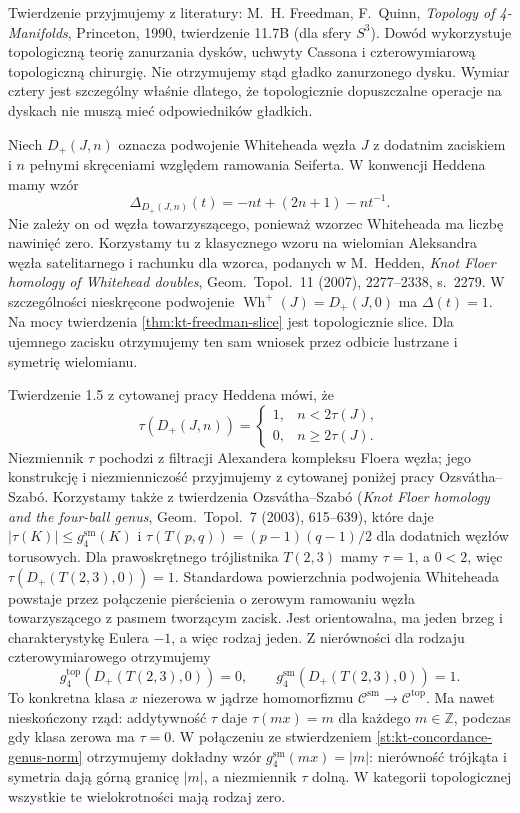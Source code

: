 \begin{uwaga}
Twierdzenie przyjmujemy z literatury:
M.~H. Freedman, F.~Quinn,
\emph{Topology of 4-Manifolds}, Princeton, 1990,
twierdzenie 11.7B (dla sfery $S^3$).
Dowód wykorzystuje topologiczną teorię zanurzania dysków,
uchwyty Cassona i czterowymiarową topologiczną chirurgię.
Nie otrzymujemy stąd gładko zanurzonego dysku. Wymiar
cztery jest szczególny właśnie dlatego, że topologicznie
dopuszczalne operacje na dyskach nie muszą mieć odpowiedników
gładkich.
\end{uwaga}

\begin{przyklad}
Niech $D_+(J,n)$ oznacza podwojenie Whiteheada
węzła $J$ z dodatnim zaciskiem i $n$ pełnymi
skręceniami względem ramowania Seiferta.
W konwencji Heddena mamy wzór
\[
\Delta_{D_+(J,n)}(t)=-nt+(2n+1)-nt^{-1}.
\]
Nie zależy on od węzła towarzyszącego, ponieważ
wzorzec Whiteheada ma liczbę nawinięć zero.
Korzystamy tu z klasycznego wzoru na wielomian
Aleksandra węzła satelitarnego i rachunku dla
wzorca, podanych w M.~Hedden,
\emph{Knot Floer homology of Whitehead doubles},
Geom.~Topol.~11 (2007), 2277--2338, s.~2279.
W szczególności nieskręcone podwojenie
$\operatorname{Wh}^{+}(J)=D_+(J,0)$ ma
$\Delta(t)=1$. Na mocy twierdzenia
\ref{thm:kt-freedman-slice} jest topologicznie slice.
Dla ujemnego zacisku otrzymujemy ten sam wniosek
przez odbicie lustrzane i symetrię wielomianu.

Twierdzenie 1.5 z cytowanej pracy Heddena mówi, że
\[
\tau(D_+(J,n))=
\begin{cases}
1,&n<2\tau(J),\\
0,&n\ge 2\tau(J).
\end{cases}
\]
Niezmiennik $\tau$ pochodzi z filtracji Alexandera
kompleksu Floera węzła; jego konstrukcję i niezmienniczość
przyjmujemy z cytowanej poniżej pracy Ozsvátha--Szabó.
Korzystamy także z twierdzenia Ozsvátha--Szabó
(\emph{Knot Floer homology and the four-ball genus},
Geom.~Topol.~7 (2003), 615--639), które daje
$|\tau(K)|\le g_4^{\mathrm{sm}}(K)$ i
$\tau(T(p,q))=(p-1)(q-1)/2$ dla dodatnich
węzłów torusowych. Dla prawoskrętnego trójlistnika
$T(2,3)$ mamy $\tau=1$, a $0<2$, więc
$\tau(D_+(T(2,3),0))=1$.
Standardowa powierzchnia podwojenia Whiteheada
powstaje przez połączenie pierścienia
o zerowym ramowaniu węzła towarzyszącego
z pasmem tworzącym zacisk. Jest orientowalna,
ma jeden brzeg i charakterystykę Eulera $-1$,
a więc rodzaj jeden. Z nierówności dla rodzaju
czterowymiarowego otrzymujemy
\[
g_4^{\mathrm{top}}(D_+(T(2,3),0))=0,\qquad
g_4^{\mathrm{sm}}(D_+(T(2,3),0))=1.
\]
To konkretna klasa $x$ niezerowa w jądrze
homomorfizmu $\mathcal C^{\mathrm{sm}}\to
\mathcal C^{\mathrm{top}}$. Ma nawet nieskończony
rząd: addytywność $\tau$ daje $\tau(mx)=m$
dla każdego $m\in\mathbb Z$, podczas gdy
klasa zerowa ma $\tau=0$.
W połączeniu ze stwierdzeniem
\ref{st:kt-concordance-genus-norm} otrzymujemy
dokładny wzór $g_4^{\mathrm{sm}}(mx)=|m|$:
nierówność trójkąta i symetria dają górną
granicę $|m|$, a niezmiennik $\tau$ dolną.
W kategorii topologicznej wszystkie te
wielokrotności mają rodzaj zero.
\end{przyklad}

